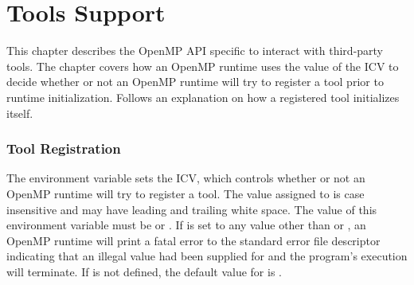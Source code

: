 %
%
%
%
%
%
%
%
%
%


\chapter{Tools Support}
\label{chap:ToolsSupport}

This chapter describes the OpenMP API specific to interact with third-party tools.
The chapter covers how an OpenMP runtime uses the value of the  ICV to decide whether or not an OpenMP runtime will try to register a tool prior to runtime initialization.
Follows an explanation on how a registered tool initializes itself.

\subsection{Tool Registration}
\label{sec:ToolsSupport_Registration}

The  environment variable sets the  ICV, which controls whether or not an OpenMP runtime will try to register a tool.
The value assigned to  is case insensitive and may have leading and trailing white space.
The value of this environment variable must be  or .
If  is set to any value other than  or , an OpenMP runtime will print a fatal error to the standard error file descriptor indicating that an illegal value had been supplied for  and the program's execution will terminate.
If  is not defined, the default value for  is .

